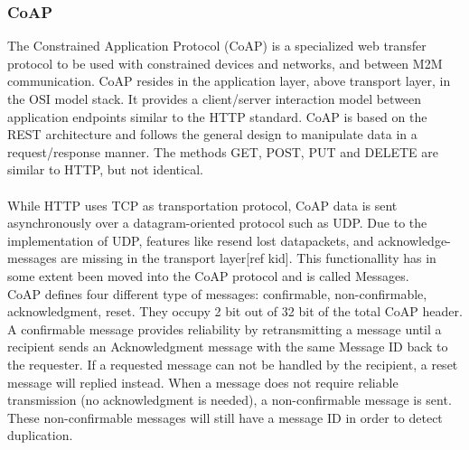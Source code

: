 \subsubsection{CoAP}
The Constrained Application Protocol (CoAP) is a specialized web transfer protocol to be used with constrained devices and networks, and between M2M communication\cite{rfc7959}. CoAP resides in the application layer, above transport layer, in the OSI model stack.
It provides a client/server interaction model between application endpoints similar to the HTTP standard. 
CoAP is based on the REST architecture and follows the general design to manipulate data in a request/response manner. The methods GET, POST, PUT and DELETE are similar to HTTP, but not identical.
\\\\
While HTTP uses TCP as transportation protocol, CoAP data is sent asynchronously over a datagram-oriented protocol such as UDP. Due to the implementation of UDP, features like resend lost datapackets, and acknowledge-messages are missing in the transport layer[ref kid]. This functionallity has in some extent been moved into the CoAP protocol and is called Messages. \\
CoAP defines four different type of messages: confirmable, non-confirmable, acknowledgment, reset. They occupy 2 bit out of 32 bit of the total CoAP header.
A confirmable message provides reliability by retransmitting a message until a recipient sends an Acknowledgment message with the same Message ID back to the requester. If a requested message can not be handled by the recipient, a reset message will replied instead. When a message does not require reliable transmission (no acknowledgment is needed), a non-confirmable message is sent. These non-confirmable messages will still have a message ID in order to detect duplication.













